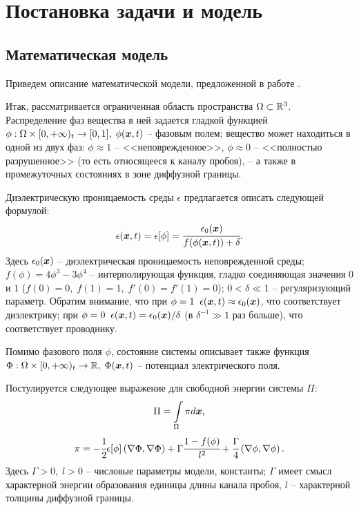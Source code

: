 
\section{Постановка задачи и модель}

\subsection{Математическая модель}

Приведем описание математической модели, предложенной в работе \cite{pitike_dielectric_breakdown}.

Итак, рассматривается ограниченная область пространства $\Omega \subset {\mathbb{R}}^3$. Распределение фаз вещества в ней задается гладкой функцией $\phi: \Omega \times [0, +\infty)_t \to [0, 1], \; \phi({\boldsymbol{x}}, t)$ -- фазовым полем; вещество может находиться в одной из двух фаз: $\phi \approx 1$ -- <<неповрежденное>>, $\phi \approx 0$ -- <<полностью разрушенное>> (то есть относящееся к каналу пробоя), -- а также в промежуточных состояниях в зоне диффузной границы.

Диэлектрическую проницаемость среды $\epsilon$ предлагается описать следующей формулой:
\begin{equation}
	\epsilon({\boldsymbol{x}}, t) = \epsilon[\phi] = \cfrac{\epsilon_0({\boldsymbol{x}})}{f(\phi({\boldsymbol{x}}, t)) + \delta} {\text{.}}
	\label{eq:epsilon}
\end{equation}
Здесь $\epsilon_0({\boldsymbol{x}})$ -- диэлектрическая проницаемость неповрежденной среды; $f(\phi) = 4\phi^3 - 3\phi^4$ -- интерполирующая функция, гладко соединяющая значения $0$ и $1$ ($f(0) = 0, \; f(1) = 1, \; f'(0) = f'(1) = 0$); $0 < \delta \ll 1$ -- регуляризующий параметр. Обратим внимание, что при $\phi = 1 \;\; \epsilon({\boldsymbol{x}}, t) \approx \epsilon_0({\boldsymbol{x}})$, что соответствует диэлектрику; при $\phi = 0 \;\; \epsilon({\boldsymbol{x}}, t) = \epsilon_0({\boldsymbol{x}}) / \delta$ (в $\delta^{-1} \gg 1$ раз больше), что соответствует проводнику.

Помимо фазового поля $\phi$, состояние системы описывает также функция $\Phi: \Omega \times [0, +\infty)_t \to {\mathbb{R}}, \; \Phi({\boldsymbol{x}}, t)$ -- потенциал электрического поля.

Постулируется следующее выражение для свободной энергии системы $\Pi$:
\begin{equation}
	\Pi = \int \limits_\Omega \pi d {\boldsymbol{x}} {\text{,}}
	\label{eq:energy}
\end{equation}
\begin{equation}
	\pi = -\cfrac{1}{2} \epsilon[\phi] \left( \nabla \Phi, \nabla \Phi \right) + \Gamma \cfrac{1 - f(\phi)}{l^2} + \cfrac{\Gamma}{4} \left( \nabla \phi, \nabla \phi \right) {\text{.}}
	\label{eq:energy_density}
\end{equation}
Здесь $\Gamma > 0, \; l > 0$ -- числовые параметры модели, константы; $\Gamma$ имеет смысл характерной энергии образования единицы длины канала пробоя, $l$ -- характерной толщины диффузной границы.

